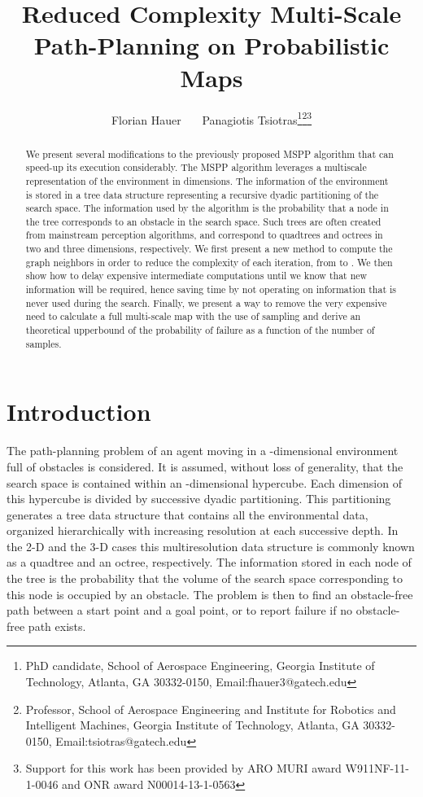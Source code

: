 \documentclass[letterpaper, 10 pt, conference]{ieeeconf}
\title{\LARGE \bf
Reduced Complexity Multi-Scale Path-Planning on Probabilistic Maps}
\author{Florian Hauer~~~ Panagiotis Tsiotras\thanks{PhD candidate, School of Aerospace Engineering, Georgia Institute of Technology, Atlanta, GA 30332-0150{, Email:\rm fhauer3@gatech.edu}}\thanks{Professor, School of Aerospace Engineering and Institute for Robotics and Intelligent Machines, Georgia Institute of Technology, Atlanta, GA 30332-0150{, Email:\rm tsiotras@gatech.edu}}\thanks{Support for this work has been provided by ARO MURI award W911NF-11-1-0046 and ONR award N00014-13-1-0563}}
\theoremstyle{definition}
\begin{document}
\maketitle



\begin{abstract}
We present several modifications to the previously proposed MSPP algorithm that can speed-up its execution considerably.
The MSPP algorithm leverages a multiscale representation of the environment in  dimensions.
The information of the environment is stored in a tree data structure representing a recursive dyadic partitioning of the search space. The information used by the algorithm is the probability that a node in the tree corresponds to an obstacle in the search space. Such trees are often created from mainstream perception algorithms, and correspond to quadtrees and octrees in two and three dimensions, respectively.
We first present a new method to compute the graph neighbors in order to reduce the complexity of each iteration, from  to .
We then show how to delay expensive intermediate computations until we know that new information will be required, hence saving time by not operating on information that is never used during the search.
Finally, we present a way to remove the very expensive need to calculate a full multi-scale map with the use of sampling and derive an theoretical upperbound of the probability of failure as a function of the number of samples.
\end{abstract}


\section{Introduction}

The path-planning problem of an agent moving in a -dimensional environment full of obstacles is considered.
It is assumed, without loss of generality, that the search space is contained within an -dimensional hypercube.
Each dimension of this hypercube is divided by successive dyadic partitioning.
This partitioning generates a tree data structure that contains
all the environmental data, organized hierarchically with increasing resolution at each successive depth.
In the 2-D and the 3-D cases this multiresolution data structure is commonly known as a quadtree and an octree, respectively. The information stored in each node of the tree is the probability that the volume of the search space corresponding to this node is occupied by an
obstacle.
The problem is then to find an obstacle-free path between a start point and a goal point, or to report failure if no obstacle-free path exists.
\end{document}
